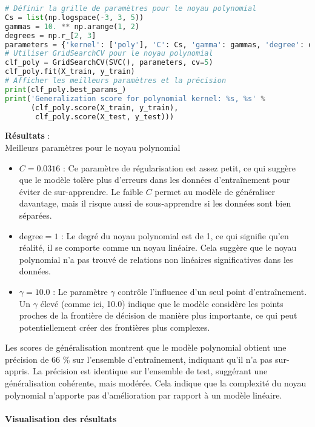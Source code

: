 \documentclass[12pt,a4paper]{report}
\begin{document}
\begin{lstlisting}[language=Python, caption=Implémentation du SVM avec noyau polynomial]
# Définir la grille de paramètres pour le noyau polynomial
Cs = list(np.logspace(-3, 3, 5))
gammas = 10. ** np.arange(1, 2)
degrees = np.r_[2, 3]
parameters = {'kernel': ['poly'], 'C': Cs, 'gamma': gammas, 'degree': degrees}
# Utiliser GridSearchCV pour le noyau polynomial
clf_poly = GridSearchCV(SVC(), parameters, cv=5)
clf_poly.fit(X_train, y_train)
# Afficher les meilleurs paramètres et la précision
print(clf_poly.best_params_)
print('Generalization score for polynomial kernel: %s, %s' %
      (clf_poly.score(X_train, y_train),
       clf_poly.score(X_test, y_test)))
\end{lstlisting}
\textbf{Résultats} : \\
Meilleurs paramètres pour le noyau polynomial
\begin{itemize}
    \item \textbf{\( C = 0.0316 \)} : Ce paramètre de régularisation est assez petit, ce qui suggère que le modèle tolère plus d'erreurs dans les données d'entraînement pour éviter de sur-apprendre. Le faible \( C \) permet au modèle de généraliser davantage, mais il risque aussi de sous-apprendre si les données sont bien séparées.
    
    \item \textbf{\( \text{degree} = 1 \)} : Le degré du noyau polynomial est de 1, ce qui signifie qu'en réalité, il se comporte comme un noyau linéaire. Cela suggère que le noyau polynomial n'a pas trouvé de relations non linéaires significatives dans les données.
    
    \item \textbf{\( \gamma = 10.0 \)} : Le paramètre \( \gamma \) contrôle l'influence d'un seul point d'entraînement. Un \( \gamma \) élevé (comme ici, 10.0) indique que le modèle considère les points proches de la frontière de décision de manière plus importante, ce qui peut potentiellement créer des frontières plus complexes.
\end{itemize}
Les scores de généralisation montrent que le modèle polynomial obtient une précision de 66 \% sur l'ensemble d'entraînement, indiquant qu'il n'a pas sur-appris. La précision est identique sur l'ensemble de test, suggérant une généralisation cohérente, mais modérée. Cela indique que la complexité du noyau polynomial n'apporte pas d'amélioration par rapport à un modèle linéaire.

\paragraph{Visualisation des résultats\\}
\end{document}
